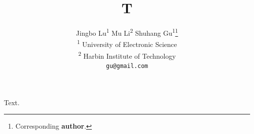 \documentclass{article}
\makeatletter
\def\authorBlock{
    Jingbo Lu\textsuperscript{1} \qquad
    Mu Li\textsuperscript{2} \qquad
    Shuhang Gu\textsuperscript{1}\thanks{Corresponding \textbf{author}.}\\
    \textsuperscript{1} University of Electronic Science \\
    \textsuperscript{2} Harbin Institute of Technology
    \\
    {\tt\small gu@gmail.com}}
\makeatother
\begin{document}
\title{T}
\author{\authorBlock}
\maketitle
Text.
\end{document}
